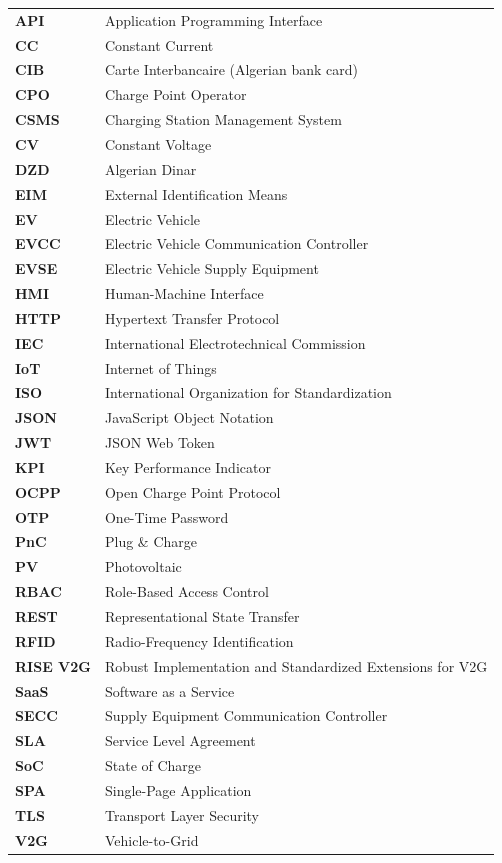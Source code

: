 \documentclass[12pt,a4paper]{report}
\begin{document}
\begin{longtable}{>{\bfseries}p{3.2cm} p{10.5cm}}
  API    & Application Programming Interface \\
  CC     & Constant Current \\
  CIB    & Carte Interbancaire (Algerian bank card) \\
  CPO    & Charge Point Operator \\
  CSMS   & Charging Station Management System \\
  CV     & Constant Voltage \\
  DZD    & Algerian Dinar \\
  EIM    & External Identification Means \\
  EV     & Electric Vehicle \\
  EVCC   & Electric Vehicle Communication Controller \\
  EVSE   & Electric Vehicle Supply Equipment \\
  HMI    & Human-Machine Interface \\
  HTTP   & Hypertext Transfer Protocol \\
  IEC    & International Electrotechnical Commission \\
  IoT    & Internet of Things \\
  ISO    & International Organization for Standardization \\
  JSON   & JavaScript Object Notation \\
  JWT    & JSON Web Token \\
  KPI    & Key Performance Indicator \\
  OCPP   & Open Charge Point Protocol \\
  OTP    & One-Time Password \\
  PnC    & Plug \& Charge \\
  PV     & Photovoltaic \\
  RBAC   & Role-Based Access Control \\
  REST   & Representational State Transfer \\
  RFID   & Radio-Frequency Identification \\
  RISE V2G & Robust Implementation and Standardized Extensions for V2G \\
  SaaS   & Software as a Service \\
  SECC   & Supply Equipment Communication Controller \\
  SLA    & Service Level Agreement \\
  SoC    & State of Charge \\
  SPA    & Single-Page Application \\
  TLS    & Transport Layer Security \\
  V2G    & Vehicle-to-Grid \\
\end{longtable}
\end{document}
